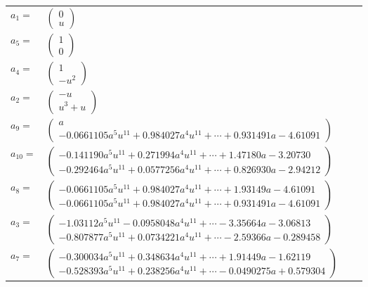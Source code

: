 \documentclass[1p]{elsarticle_modified}
\theoremstyle{definition}
\begin{document}
\begin{tabular}{m{7pt} m{180pt} m{7pt} m{180pt} }
\flushright $a_{1}=$&$\begin{pmatrix}0\\u\end{pmatrix}$ \\
\flushright $a_{5}=$&$\begin{pmatrix}1\\0\end{pmatrix}$ \\
\flushright $a_{4}=$&$\begin{pmatrix}1\\- u^2\end{pmatrix}$ \\
\flushright $a_{2}=$&$\begin{pmatrix}- u\\u^3+u\end{pmatrix}$ \\
\flushright $a_{9}=$&$\begin{pmatrix}a\\-0.0661105 a^{5} u^{11}+0.984027 a^{4} u^{11}+\cdots+0.931491 a-4.61091\end{pmatrix}$ \\
\flushright $a_{10}=$&$\begin{pmatrix}-0.141190 a^{5} u^{11}+0.271994 a^{4} u^{11}+\cdots+1.47180 a-3.20730\\-0.292464 a^{5} u^{11}+0.0577256 a^{4} u^{11}+\cdots+0.826930 a-2.94212\end{pmatrix}$ \\
\flushright $a_{8}=$&$\begin{pmatrix}-0.0661105 a^{5} u^{11}+0.984027 a^{4} u^{11}+\cdots+1.93149 a-4.61091\\-0.0661105 a^{5} u^{11}+0.984027 a^{4} u^{11}+\cdots+0.931491 a-4.61091\end{pmatrix}$ \\
\flushright $a_{3}=$&$\begin{pmatrix}-1.03112 a^{5} u^{11}-0.0958048 a^{4} u^{11}+\cdots-3.35664 a-3.06813\\-0.807877 a^{5} u^{11}+0.0734221 a^{4} u^{11}+\cdots-2.59366 a-0.289458\end{pmatrix}$ \\
\flushright $a_{7}=$&$\begin{pmatrix}-0.300034 a^{5} u^{11}+0.348634 a^{4} u^{11}+\cdots+1.91449 a-1.62119\\-0.528393 a^{5} u^{11}+0.238256 a^{4} u^{11}+\cdots-0.0490275 a+0.579304\end{pmatrix}$ \\

\end{tabular}
\end{document}
